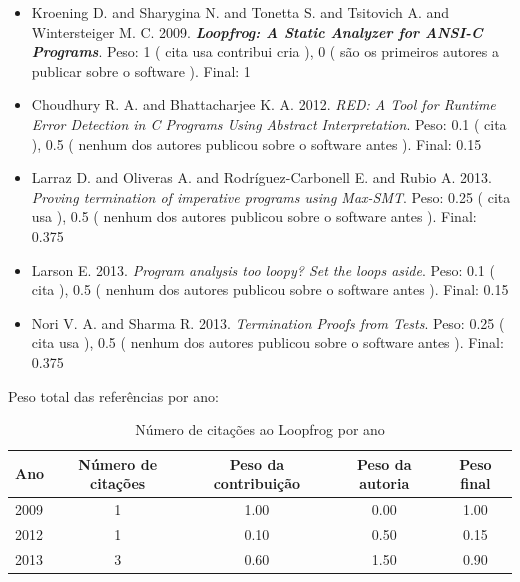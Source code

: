 \begin{itemize}
\item Kroening D. and Sharygina N. and Tonetta S. and Tsitovich A. and Wintersteiger M. C.
      2009.
        \textbf{\textit{ Loopfrog: A Static Analyzer for ANSI-C Programs}}.
      Peso:
      1 (
          cita
          usa
          contribui
          cria
      ),
      0 (
são os primeiros autores a publicar sobre o software
      ).
      Final:
      1

\item Choudhury R. A. and Bhattacharjee K. A.
      2012.
        \textit{ RED: A Tool for Runtime Error Detection in C Programs Using Abstract Interpretation}.
      Peso:
      0.1 (
          cita
      ),
      0.5 (
nenhum dos autores publicou sobre o software antes
      ).
      Final:
      0.15

\item Larraz D. and Oliveras A. and Rodríguez-Carbonell E. and Rubio A.
      2013.
        \textit{ Proving termination of imperative programs using Max-SMT}.
      Peso:
      0.25 (
          cita
          usa
      ),
      0.5 (
nenhum dos autores publicou sobre o software antes
      ).
      Final:
      0.375

\item Larson E.
      2013.
        \textit{ Program analysis too loopy? Set the loops aside}.
      Peso:
      0.1 (
          cita
      ),
      0.5 (
nenhum dos autores publicou sobre o software antes
      ).
      Final:
      0.15

\item Nori V. A. and Sharma R.
      2013.
        \textit{ Termination Proofs from Tests}.
      Peso:
      0.25 (
          cita
          usa
      ),
      0.5 (
nenhum dos autores publicou sobre o software antes
      ).
      Final:
      0.375

\end{itemize}

Peso total das referências por ano:

\begin{table}[h]
\caption{Número de citações ao Loopfrog por ano}
\centering
\begin{tabular}{| l | c | c | c | c |}
  \hline
  Ano & Número de citações & Peso da contribuição & Peso da autoria & Peso final \\
  \hline
  2009
    & 1
    & 1.00
    & 0.00
    & 1.00 \\
  2012
    & 1
    & 0.10
    & 0.50
    & 0.15 \\
  2013
    & 3
    & 0.60
    & 1.50
    & 0.90 \\
  \hline
\end{tabular}
\end{table}


